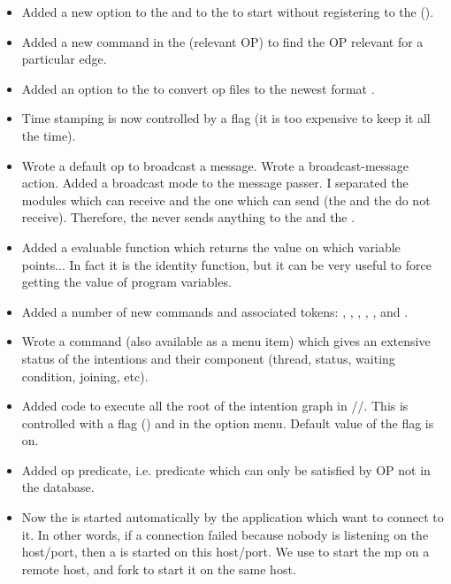 \begin{itemize}

\item Added a new option to the \CPK{} and to the \XPK{} to start
without registering to the \OPRSS{} ().

\item Added a new command in the \OPE{} (relevant OP) to find the
OP relevant for a particular edge.

\item Added an option to the \OPE{} to convert op files to the
newest format .

\item Time stamping is now controlled by a flag (it is too
expensive to keep it all the time).

\item Wrote a default op to broadcast a message. Wrote a broadcast-message action.
Added a broadcast mode to the message passer. I separated the modules which can
receive and the one which can send (the \OPE{} and the \OPRSS{} do not
receive). Therefore, the \MPA{} never sends anything to the \OPRSS{} and the
\OPE{}.

\item Added a  evaluable function which returns the value on which
variable points... In fact it is the identity function, but it can be very
useful to force getting the value of program variables.

\item Added a number of new commands and associated tokens:
, , , , ,  and .

\item Wrote a  command (also available as a menu item)
which gives an extensive status of the intentions and their component (thread,
status, waiting condition, joining, etc).

\item Added code to execute all the root of the intention graph in //. This
is controlled with a flag () and in the
option menu. Default value of the flag is on.

\item Added op predicate, i.e. predicate which can only be satisfied by
OP not in the database.

\item Now the \MPA{} is started automatically by the application which want to
connect to it. In other words, if a connection failed because nobody is
listening on the host/port, then a \MPA{} is started on this host/port.  We use
 to start the mp on a remote host, and fork to start it on the same host.


\end{itemize}
